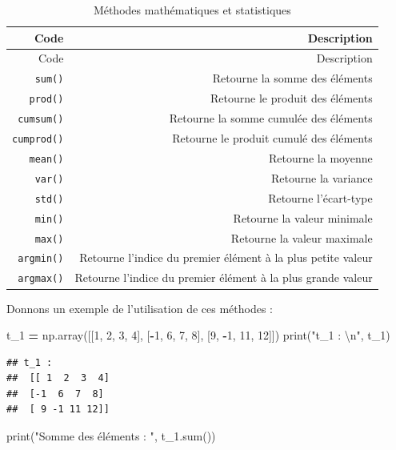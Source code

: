 \documentclass[12pt,]{book}
\newenvironment{Shaded}{\begin{snugshade}}{\end{snugshade}}
\newcommand{\DecValTok}[1]{\textcolor[rgb]{0.00,0.00,0.81}{#1}}
\newcommand{\CharTok}[1]{\textcolor[rgb]{0.31,0.60,0.02}{#1}}
\newcommand{\StringTok}[1]{\textcolor[rgb]{0.31,0.60,0.02}{#1}}
\newcommand{\OperatorTok}[1]{\textcolor[rgb]{0.81,0.36,0.00}{\textbf{#1}}}
\newcommand{\BuiltInTok}[1]{#1}
\newcommand{\NormalTok}[1]{#1}
\numberwithin{equation}{section}
\numberwithin{countremarque}{section}
\begin{document}
\begin{longtable}[]{@{}rr@{}}
\caption{\label{tab:numpy-maths-methodes} Méthodes mathématiques et
statistiques}\tabularnewline
\toprule
Code & Description\tabularnewline
\midrule
\endfirsthead
\toprule
Code & Description\tabularnewline
\midrule
\endhead
\texttt{sum()} & Retourne la somme des éléments\tabularnewline
\texttt{prod()} & Retourne le produit des éléments\tabularnewline
\texttt{cumsum()} & Retourne la somme cumulée des
éléments\tabularnewline
\texttt{cumprod()} & Retourne le produit cumulé des
éléments\tabularnewline
\texttt{mean()} & Retourne la moyenne\tabularnewline
\texttt{var()} & Retourne la variance\tabularnewline
\texttt{std()} & Retourne l'écart-type\tabularnewline
\texttt{min()} & Retourne la valeur minimale\tabularnewline
\texttt{max()} & Retourne la valeur maximale\tabularnewline
\texttt{argmin()} & Retourne l'indice du premier élément à la plus
petite valeur\tabularnewline
\texttt{argmax()} & Retourne l'indice du premier élément à la plus
grande valeur\tabularnewline
\bottomrule
\end{longtable}

Donnons un exemple de l'utilisation de ces méthodes :

\begin{Shaded}
\begin{Highlighting}[]
\NormalTok{t_1 }\OperatorTok{=}\NormalTok{ np.array([[}\DecValTok{1}\NormalTok{, }\DecValTok{2}\NormalTok{, }\DecValTok{3}\NormalTok{, }\DecValTok{4}\NormalTok{], [}\OperatorTok{-}\DecValTok{1}\NormalTok{, }\DecValTok{6}\NormalTok{, }\DecValTok{7}\NormalTok{, }\DecValTok{8}\NormalTok{], [}\DecValTok{9}\NormalTok{, }\OperatorTok{-}\DecValTok{1}\NormalTok{, }\DecValTok{11}\NormalTok{, }\DecValTok{12}\NormalTok{]])}
\BuiltInTok{print}\NormalTok{(}\StringTok{"t_1 : }\CharTok{\textbackslash{}n}\StringTok{"}\NormalTok{, t_1)}
\end{Highlighting}
\end{Shaded}

\begin{lstlisting}
## t_1 : 
##  [[ 1  2  3  4]
##  [-1  6  7  8]
##  [ 9 -1 11 12]]
\end{lstlisting}

\begin{Shaded}
\begin{Highlighting}[]
\BuiltInTok{print}\NormalTok{(}\StringTok{"Somme des éléments : "}\NormalTok{, t_1.}\BuiltInTok{sum}\NormalTok{())}
\end{Highlighting}
\end{Shaded}
\end{document}
